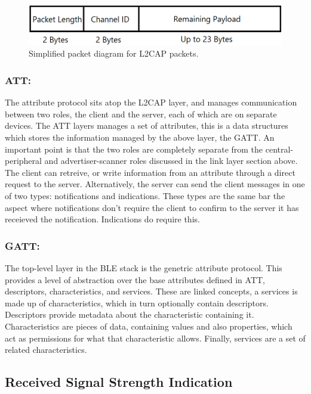 \documentclass{l4proj}
\begin{document}
\begin{figure}[!htb]
    \centering
    \includegraphics[width=0.8\linewidth]{images/l2cap.png}

    \caption{ Simplified packet diagram for L2CAP packets. }

    \label{fig:l2cap}
\end{figure}

\subsubsection{ATT:} The attribute protocol sits atop the L2CAP layer, and manages communication between two roles, the client and the server, each of which are on separate devices. The ATT layers manages a set of attributes, this is a data structures which stores the information managed by the above layer, the GATT. An important point is that the two roles are completely separate from the central-peripheral and advertiser-scanner roles \citep{gomez_overview_2012} discussed in the link layer section above. The client can retreive, or write information from an attribute through a direct request to the server. Alternatively, the server can send the client messages in one of two types: notifications and indications. These types are the same bar the aspect where notifications don't require the client to confirm to the server it has receieved the notification. Indications do require this.

\subsubsection{GATT:} The top-level layer in the BLE stack is the genetric attribute protocol. This provides a level of abstraction over the base attributes defined in ATT, descriptors, characteristics, and services. These are linked concepts, a services is made up of characteristics, which in turn optionally contain descriptors. Descriptors provide metadata about the characteristic containing it. Characteristics are pieces of data, containing values and also properties, which act as permissions for what that characteristic allows. Finally, services are a set of related characteristics.

\subsection{Received Signal Strength Indication}
\end{document}
